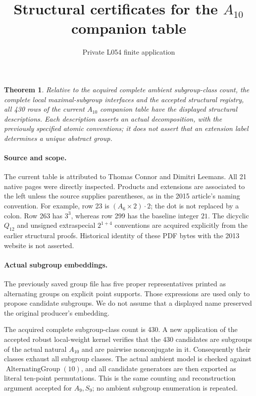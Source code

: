 \documentclass[11pt]{article}
\title{Structural certificates for the $A_{10}$ companion table}
\author{Private L054 finite application}\date{}
\newtheorem{theorem}{Theorem}
\begin{document}
\maketitle
\begin{theorem}
Relative to the acquired complete ambient subgroup-class count, the complete
local maximal-subgroup interfaces and the accepted structural registry,
all 430 rows of the current $A_{10}$ companion table have the displayed
structural descriptions. Each description asserts an actual decomposition,
with the previously specified atomic conventions; it does not assert that
an extension label determines a unique abstract group.
\end{theorem}

\paragraph{Source and scope.}
The current table is attributed to Thomas Connor and Dimitri Leemans.
All 21 native pages were directly inspected. Products and extensions are
associated to the left unless the source supplies parentheses, as in the
2015 article's naming convention. For example, row 23 is
$(A_6\times2)\mathbin{\cdot}2$; the dot is not replaced by a colon.
Row 263 has $3^3$, whereas row 299 has the baseline integer $21$.
The dicyclic $Q_{12}$ and unsigned extraspecial $2^{1+4}$ conventions are
acquired explicitly from the earlier structural proofs. Historical identity
of these PDF bytes with the 2013 website is not asserted.

\paragraph{Actual subgroup embeddings.}
The previously saved group file has five proper representatives printed as
alternating groups on explicit point supports. Those expressions are used
only to propose candidate subgroups. We do not assume that a displayed name
preserved the original producer's embedding.

The acquired complete subgroup-class count is 430. A new application of the
accepted robust local-weight kernel verifies that the 430 candidates are
subgroups of the actual natural $A_{10}$ and are pairwise nonconjugate in it.
Consequently their classes exhaust all subgroup classes. The actual ambient
model is checked against $\operatorname{AlternatingGroup}(10)$, and all
candidate generators are then exported as literal ten-point permutations.
This is the same counting and reconstruction argument accepted for
$A_9,S_9$; no ambient subgroup enumeration is repeated.
\end{document}
